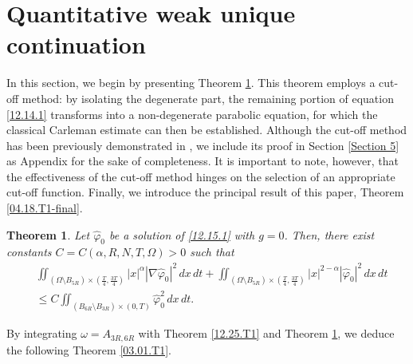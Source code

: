 \documentclass[11pt]{article}
\newtheorem{theorem}{Theorem}[section]
\numberwithin{equation}{section}
\begin{document}
\section{Quantitative weak unique continuation}\label{Section 6}

  In this section, we begin by presenting Theorem \ref{04.18.T1g}. This theorem employs a cut-off method: by isolating the degenerate part, the remaining portion of equation \eqref{12.14.1} transforms into a non-degenerate parabolic equation, for which the classical Carleman estimate can then be established. Although the cut-off method has been previously demonstrated in \cite{Wu}, we include its proof in Section \ref{Section 5} as Appendix for the sake of completeness. It is important to note, however, that the effectiveness of the cut-off method hinges on the selection of an appropriate cut-off function. Finally, we introduce the principal result of this paper, Theorem \ref{04.18.T1-final}.

 \begin{theorem}\label{04.18.T1g}
 	Let $\widehat{\varphi}_0$ be a solution of \eqref{12.15.1} with $g = 0$. Then, there exist constants $C = C(\alpha, R, N, T, \Omega) > 0$ such that
 	\begin{equation*}
 		\begin{split}
 			&\iint_{(\Omega \setminus B_{5R}) \times \left(\frac{T}{4}, \frac{3T}{4}\right)} |x|^\alpha |\nabla\widehat{\varphi}_0|^2 \, dx \, dt + \iint_{(\Omega \setminus B_{5R}) \times \left(\frac{T}{4}, \frac{3T}{4}\right)} |x|^{2-\alpha} |\widehat{\varphi}_0|^2 \, dx \, dt\\
 			&\leq C \iint_{(B_{6R} \setminus B_{3R}) \times (0,T)} \widehat{\varphi}_0^2 \, dx \, dt.
 		\end{split}
 	\end{equation*}
 \end{theorem}

By integrating $\omega = A_{3R,6R}$ with Theorem \ref{12.25.T1} and Theorem \ref{04.18.T1g}, we deduce the following Theorem \ref{03.01.T1}.
\end{document}

